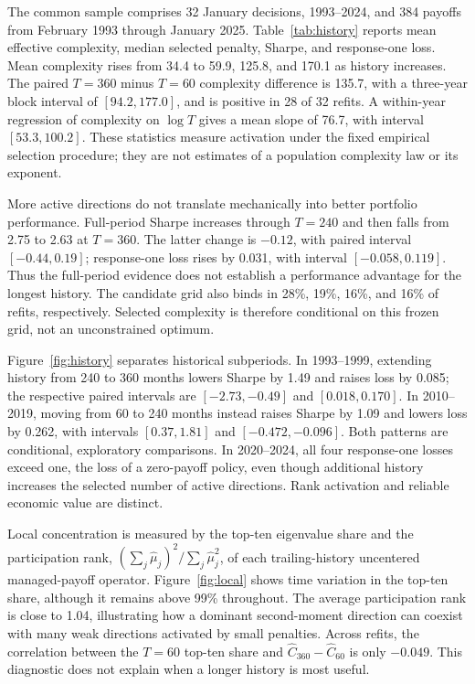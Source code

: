 \documentclass[12pt,letterpaper]{article}
\newcommand{\C}{\widehat C}
\begin{document}
The common sample comprises 32 January decisions, 1993--2024, and 384 payoffs from February 1993 through January 2025. Table~\ref{tab:history} reports mean effective complexity, median selected penalty, Sharpe, and response-one loss. Mean complexity rises from 34.4 to 59.9, 125.8, and 170.1 as history increases. The paired $T=360$ minus $T=60$ complexity difference is 135.7, with a three-year block interval of $[94.2,177.0]$, and is positive in 28 of 32 refits. A within-year regression of complexity on $\log T$ gives a mean slope of 76.7, with interval $[53.3,100.2]$. These statistics measure activation under the fixed empirical selection procedure; they are not estimates of a population complexity law or its exponent.



More active directions do not translate mechanically into better portfolio performance. Full-period Sharpe increases through $T=240$ and then falls from 2.75 to 2.63 at $T=360$. The latter change is $-0.12$, with paired interval $[-0.44,0.19]$; response-one loss rises by 0.031, with interval $[-0.058,0.119]$. Thus the full-period evidence does not establish a performance advantage for the longest history. The candidate grid also binds in 28\%, 19\%, 16\%, and 16\% of refits, respectively. Selected complexity is therefore conditional on this frozen grid, not an unconstrained optimum.

Figure~\ref{fig:history} separates historical subperiods. In 1993--1999, extending history from 240 to 360 months lowers Sharpe by 1.49 and raises loss by 0.085; the respective paired intervals are $[-2.73,-0.49]$ and $[0.018,0.170]$. In 2010--2019, moving from 60 to 240 months instead raises Sharpe by 1.09 and lowers loss by 0.262, with intervals $[0.37,1.81]$ and $[-0.472,-0.096]$. Both patterns are conditional, exploratory comparisons. In 2020--2024, all four response-one losses exceed one, the loss of a zero-payoff policy, even though additional history increases the selected number of active directions. Rank activation and reliable economic value are distinct.

Local concentration is measured by the top-ten eigenvalue share and the participation rank, $(\sum_j\widehat\mu_j)^2/\sum_j\widehat\mu_j^2$, of each trailing-history uncentered managed-payoff operator. Figure~\ref{fig:local} shows time variation in the top-ten share, although it remains above 99\% throughout. The average participation rank is close to 1.04, illustrating how a dominant second-moment direction can coexist with many weak directions activated by small penalties. Across refits, the correlation between the $T=60$ top-ten share and $\C_{360}-\C_{60}$ is only $-0.049$. This diagnostic does not explain when a longer history is most useful.
\end{document}
